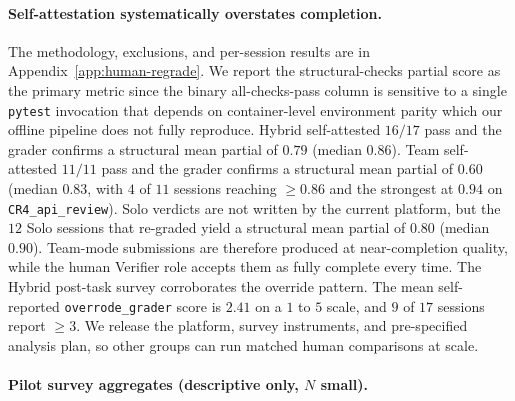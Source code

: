 \documentclass{article}
\begin{document}
\paragraph{Self-attestation systematically overstates completion.} The methodology, exclusions, and per-session results are in Appendix~\ref{app:human-regrade}. We report the structural-checks partial score as the primary metric since the binary all-checks-pass column is sensitive to a single \texttt{pytest} invocation that depends on container-level environment parity which our offline pipeline does not fully reproduce. Hybrid self-attested $16 / 17$ pass and the grader confirms a structural mean partial of $0.79$ (median $0.86$). Team self-attested $11 / 11$ pass and the grader confirms a structural mean partial of $0.60$ (median $0.83$, with $4$ of $11$ sessions reaching $\geq 0.86$ and the strongest at $0.94$ on \texttt{CR4\_api\_review}). Solo verdicts are not written by the current platform, but the $12$ Solo sessions that re-graded yield a structural mean partial of $0.80$ (median $0.90$). Team-mode submissions are therefore produced at near-completion quality, while the human Verifier role accepts them as fully complete every time. The Hybrid post-task survey corroborates the override pattern. The mean self-reported \texttt{overrode\_grader} score is $2.41$ on a $1$ to $5$ scale, and $9$ of $17$ sessions report $\geq 3$. We release the platform, survey instruments, and pre-specified analysis plan, so other groups can run matched human comparisons at scale.

\paragraph{Pilot survey aggregates (descriptive only, $N$ small).}
\end{document}

